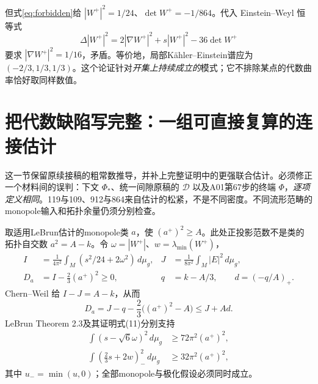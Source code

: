 \documentclass[UTF8,a4paper,11pt,fontset=fandol]{ctexart}
\numberwithin{equation}{section}
\theoremstyle{definition}
\newcommand{\dd}{\,d\mu_g}
\begin{document}
但式\eqref{eq:forbidden}给 $|W^+|^2=1/24$、$\det W^+=-1/864$。代入 Einstein--Weyl 恒等式
\[
\Delta|W^+|^2=2|\nabla W^+|^2+s|W^+|^2-36\det W^+
\]
要求 $|\nabla W^+|^2=1/16$，矛盾。等价地，局部K\"ahler--Einstein谱应为 $(-2/3,1/3,1/3)$。这个论证针对\emph{开集上持续成立的}模式；它不排除某点的代数曲率恰好取同样数值。

\section{把代数缺陷写完整：一组可直接复算的连接估计}
这一节保留原续接稿的粗常数推导，并补上完整证明中的更强联合估计。必须修正一个材料间的误判：下文 $\Phi_*$、统一间隙原稿的 $\mathcal D$ 以及A01第67步的终端 $\Phi$，\emph{逐项定义相同}。119与109、912与864来自估计的松紧，不是不同密度。不同流形范畴的monopole输入和拓扑余量仍须分别检查。

取适用LeBrun估计的monopole类 $a$，使 $(a^+)^2\ge A$。此处正投影范数不是类的拓扑自交数 $a^2=A-k$。令 $\omega=|W^+|$、$w=\lambda_{\min}(W^+)$，
\begin{align}
 I&=\frac1{4\pi^2}\int_M(s^2/24+2\omega^2)\dd,
 &J&=\frac1{8\pi^2}\int_M|E|^2\dd,\\
 D_a&=I-\frac23(a^+)^2\ge0,
 &q&=k-A/3,\qquad d=(-q/A)_+.
\end{align}
Chern--Weil 给 $I-J=A-k$，从而
\begin{equation}\label{eq:Da}
D_a=J-q-\frac23\big((a^+)^2-A\big)\le J+Ad.
\end{equation}
LeBrun Theorem 2.3及其证明式(11)分别支持
\begin{align}
\int(s-\sqrt6\omega)^2\dd&\ge72\pi^2(a^+)^2,\\
\int\left(\frac23s+2w\right)_{-}^{\!2}\dd&\ge32\pi^2(a^+)^2,
\end{align}
其中 $u_-=\min(u,0)$；全部monopole与极化假设必须同时成立\cite{LeBrun2001}。
\end{document}

